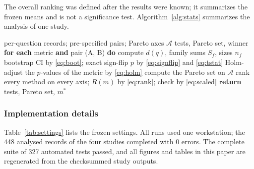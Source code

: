 \documentclass[conference]{IEEEtran}
\begin{document}
The overall ranking was defined after the results were known; it summarizes the frozen means and is not a significance test. Algorithm~\ref{alg:stats} summarizes the analysis of one study.

\begin{algorithm}[!t]
\caption{Family-clustered comparison and overall ranking of one study}
\label{alg:stats}
\begin{algorithmic}[1]
\Require per-question records; pre-specified pairs; Pareto axes $\mathcal{A}$
\Ensure tests, Pareto set, winner
\State \textbf{for each} metric \textbf{and} pair (A, B) \textbf{do}
\State \hspace*{1\algorithmicindent}compute $d(q)$, family sums $S_f$, sizes $n_f$
\State \hspace*{1\algorithmicindent}bootstrap CI by \eqref{eq:boot}; exact sign-flip $p$ by \eqref{eq:signflip} and \eqref{eq:tstat}
\State \hspace*{1\algorithmicindent}Holm-adjust the $p$-values of the metric by \eqref{eq:holm}
\State compute the Pareto set on $\mathcal{A}$
\State rank every method on every axis; $R(m)$ by \eqref{eq:rank}; check by \eqref{eq:scaled}
\State \textbf{return} tests, Pareto set, $m^*$
\end{algorithmic}
\end{algorithm}

\subsubsection{Implementation details}

Table~\ref{tab:settings} lists the frozen settings. All runs used one workstation; the 448 analysed records of the four studies completed with 0 errors. The complete suite of 327 automated tests passed, and all figures and tables in this paper are regenerated from the checksummed study outputs.
\end{document}
